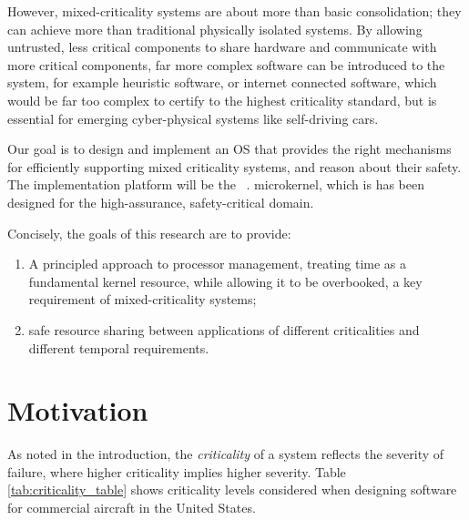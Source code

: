 However, mixed-criticality systems are about more than basic consolidation; they can achieve more
than traditional physically isolated systems. By allowing untrusted, less critical components to
share hardware and communicate with more critical components, far more complex software can be
introduced to the system, for example heuristic software, or internet connected software, 
which would be far too complex to certify to the highest criticality standard,
but is essential for emerging cyber-physical systems like self-driving cars.

Our goal is to design and implement an OS that provides the right mechanisms for efficiently
supporting mixed criticality systems, and reason about their safety.
The implementation platform will be the \selfour~\citep{Klein_EHA_etal_09}.
microkernel, which is has been designed for the high-assurance, safety-critical domain.

Concisely, the goals of this research are to provide:
\begin{enumerate}[label=\textbf{G\arabic*}] 
    \item\label{G1} A principled approach to
    processor management, treating time as a fundamental kernel resource, while
    allowing it to be overbooked, a key requirement of mixed-criticality systems;
    \item safe resource sharing between applications of different criticalities and
    different temporal requirements.  
\end{enumerate}


\section{Motivation}

As noted in the introduction, the \emph{criticality} of a system reflects the
severity of failure, where higher criticality implies higher severity.  Table
\ref{tab:criticality_table} shows criticality levels considered when designing
software for commercial aircraft in the United States.

